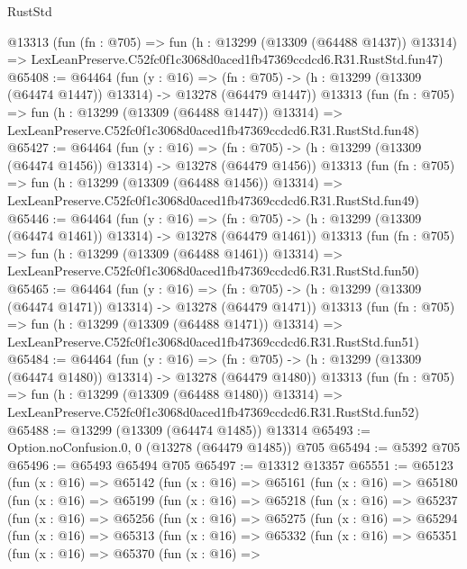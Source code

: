 \begin{lexlean}{RustStd}
\begin{coremodule}
    @13313
    (fun (fn : @705) =>
    fun (h : @13299 (@13309 (@64488 @1437)) @13314) =>
    LexLeanPreserve.C52fc0f1c3068d0aced1fb47369ccdcd6.R31.RustStd.fun47)
@65408 := @64464
    (fun (y : @16) =>
    (fn : @705) -> (h : @13299 (@13309 (@64474 @1447)) @13314) -> @13278 (@64479 @1447))
    @13313
    (fun (fn : @705) =>
    fun (h : @13299 (@13309 (@64488 @1447)) @13314) =>
    LexLeanPreserve.C52fc0f1c3068d0aced1fb47369ccdcd6.R31.RustStd.fun48)
@65427 := @64464
    (fun (y : @16) =>
    (fn : @705) -> (h : @13299 (@13309 (@64474 @1456)) @13314) -> @13278 (@64479 @1456))
    @13313
    (fun (fn : @705) =>
    fun (h : @13299 (@13309 (@64488 @1456)) @13314) =>
    LexLeanPreserve.C52fc0f1c3068d0aced1fb47369ccdcd6.R31.RustStd.fun49)
@65446 := @64464
    (fun (y : @16) =>
    (fn : @705) -> (h : @13299 (@13309 (@64474 @1461)) @13314) -> @13278 (@64479 @1461))
    @13313
    (fun (fn : @705) =>
    fun (h : @13299 (@13309 (@64488 @1461)) @13314) =>
    LexLeanPreserve.C52fc0f1c3068d0aced1fb47369ccdcd6.R31.RustStd.fun50)
@65465 := @64464
    (fun (y : @16) =>
    (fn : @705) -> (h : @13299 (@13309 (@64474 @1471)) @13314) -> @13278 (@64479 @1471))
    @13313
    (fun (fn : @705) =>
    fun (h : @13299 (@13309 (@64488 @1471)) @13314) =>
    LexLeanPreserve.C52fc0f1c3068d0aced1fb47369ccdcd6.R31.RustStd.fun51)
@65484 := @64464
    (fun (y : @16) =>
    (fn : @705) -> (h : @13299 (@13309 (@64474 @1480)) @13314) -> @13278 (@64479 @1480))
    @13313
    (fun (fn : @705) =>
    fun (h : @13299 (@13309 (@64488 @1480)) @13314) =>
    LexLeanPreserve.C52fc0f1c3068d0aced1fb47369ccdcd6.R31.RustStd.fun52)
@65488 := @13299 (@13309 (@64474 @1485)) @13314
@65493 := Option.noConfusion.{0, 0} (@13278 (@64479 @1485)) @705
@65494 := @5392 @705
@65496 := @65493 @65494 @705
@65497 := @13312 @13357
@65551 := @65123
    (fun (x : @16) =>
    @65142
      (fun (x : @16) =>
      @65161
        (fun (x : @16) =>
        @65180
          (fun (x : @16) =>
          @65199
            (fun (x : @16) =>
            @65218
              (fun (x : @16) =>
              @65237
                (fun (x : @16) =>
                @65256
                  (fun (x : @16) =>
                  @65275
                    (fun (x : @16) =>
                    @65294
                      (fun (x : @16) =>
                      @65313
                        (fun (x : @16) =>
                        @65332
                          (fun (x : @16) =>
                          @65351
                            (fun (x : @16) =>
                            @65370
                              (fun (x : @16) =>

\end{coremodule}
\end{lexlean}
